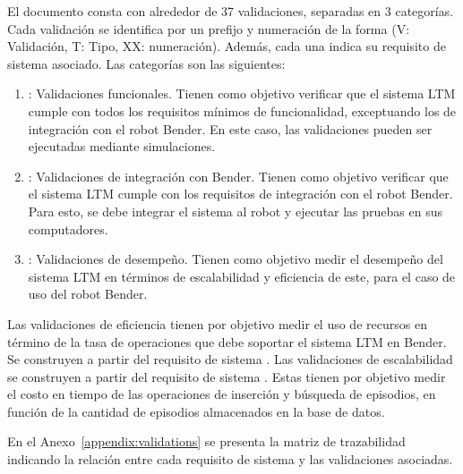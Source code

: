 El documento consta con alrededor de 37 validaciones, separadas en 3 categorías. Cada validación se identifica por un prefijo y numeración de la forma  (V: Validación, T: Tipo, XX: numeración). Además, cada una indica su requisito de sistema asociado. Las categorías son las siguientes:
\begin{enumerate}
	\item {}: Validaciones funcionales. Tienen como objetivo verificar que el sistema LTM cumple con todos los requisitos mínimos de funcionalidad, exceptuando los de integración con el robot Bender. En este caso, las validaciones pueden ser ejecutadas mediante simulaciones.
	\item {}: Validaciones de integración con Bender. Tienen como objetivo verificar que el sistema LTM cumple con los requisitos de integración con el robot Bender. Para esto, se debe integrar el sistema al robot y ejecutar las pruebas en sus computadores.
	\item {}: Validaciones de desempeño. Tienen como objetivo medir el desempeño del sistema LTM en términos de escalabilidad y eficiencia de este, para el caso de uso del robot Bender.
\end{enumerate}

Las validaciones  de eficiencia tienen por objetivo medir el uso de recursos en término de la tasa de operaciones que debe soportar el sistema LTM en Bender. Se construyen a partir del requisito de sistema . Las validaciones de escalabilidad se construyen a partir del requisito de sistema . Estas tienen por objetivo medir el costo en tiempo de las operaciones de inserción y búsqueda de episodios, en función de la cantidad de episodios almacenados en la base de datos.

En el Anexo~\ref{appendix:validations} se presenta la matriz de trazabilidad indicando la relación entre cada requisito de sistema y las validaciones asociadas.






